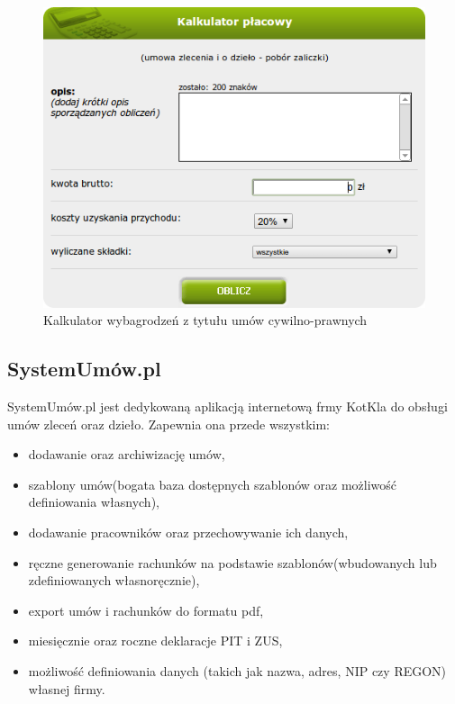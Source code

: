 \begin{figure}[tdh]
    \begin{center}
	\includegraphics[scale=.6]{img/kalkulator.png}
	\caption{Kalkulator wybagrodzeń z tytułu umów cywilno-prawnych}
	\label{kalkulator}
    \end{center}
\end{figure}

\subsection[SystemUmów.pl][SystemUmów.pl]{SystemUmów.pl}
SystemUmów.pl jest dedykowaną aplikacją internetową frmy KotKla do obsługi umów zleceń oraz dzieło. Zapewnia ona przede wszystkim:
\begin{itemize}
	\item dodawanie oraz archiwizację umów,
	\item szablony umów(bogata baza dostępnych szablonów oraz możliwość definiowania własnych),
	\item dodawanie pracowników oraz przechowywanie ich danych,
	\item ręczne generowanie rachunków na podstawie szablonów(wbudowanych lub zdefiniowanych własnoręcznie),
	\item export umów i rachunków do formatu pdf,
	\item miesięcznie oraz roczne deklaracje PIT i ZUS,
	\item możliwość definiowania danych (takich jak nazwa, adres, NIP czy REGON) własnej firmy.
\end{itemize}

